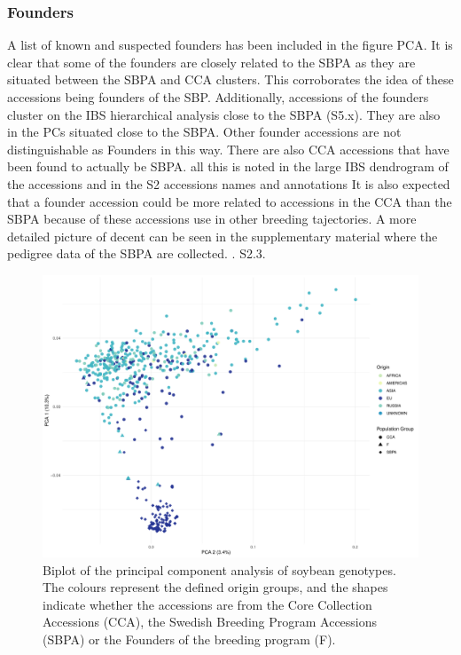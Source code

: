 \documentclass[9pt, twocolumn,twoside]{gsajnl}
\begin{document}
\subsubsection{Founders}
A list of known and suspected founders has been included in the figure PCA. It is clear that some of the founders are closely related to the SBPA as they are situated between the SBPA and CCA clusters. This corroborates the idea of these accessions being founders of the SBP. Additionally, accessions of the founders cluster on the IBS hierarchical analysis close to the SBPA (S5.x). They are also in the PCs situated close to the SBPA. Other founder accessions are not distinguishable as Founders in this way. There are also CCA accessions that have been found to actually be SBPA. all this is noted in the large IBS dendrogram of the accessions and in the S2 accessions names and annotations  It is also expected that a founder accession could be more related to accessions in the CCA than the SBPA because of these accessions use in other breeding tajectories. A more detailed picture of decent can be seen in the supplementary material where the pedigree data of the SBPA are collected. . S2.3.

\begin{figure}[p]
\centering
\includegraphics[width=\linewidth]{PCA1.pdf}
\caption{Biplot of the principal component analysis of soybean genotypes. The colours represent the defined origin groups, and the shapes indicate whether the accessions are from the Core Collection Accessions (CCA), the Swedish Breeding Program Accessions (SBPA) or the Founders of the breeding program (F).}
\label{fig:pca}
\end{figure}
\end{document}
